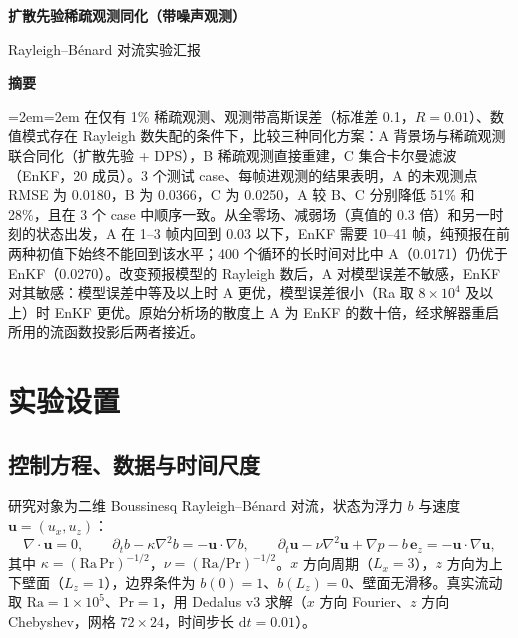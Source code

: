 \documentclass[10.5pt,a4paper]{article}
\begin{document}
\begin{center}
{\LARGE\bfseries 扩散先验稀疏观测同化（带噪声观测）\par}\vspace{.5em}
{\large Rayleigh--B\'enard 对流实验汇报\par}
\end{center}
\vspace{.3em}

\begin{center}\textbf{摘\quad 要}\end{center}
\begingroup\small\leftskip=2em\rightskip=2em
在仅有 1\% 稀疏观测、观测带高斯误差（标准差 0.1，$R=0.01$）、数值模式存在 Rayleigh 数失配的条件下，比较三种同化方案：A 背景场与稀疏观测联合同化（扩散先验 + DPS），B 稀疏观测直接重建，C 集合卡尔曼滤波（EnKF，20 成员）。3 个测试 case、每帧进观测的结果表明，A 的未观测点 RMSE 为 0.0180，B 为 0.0366，C 为 0.0250，A 较 B、C 分别降低 51\% 和 28\%，且在 3 个 case 中顺序一致。从全零场、减弱场（真值的 0.3 倍）和另一时刻的状态出发，A 在 1--3 帧内回到 0.03 以下，EnKF 需要 10--41 帧，纯预报在前两种初值下始终不能回到该水平；400 个循环的长时间对比中 A（0.0171）仍优于 EnKF（0.0270）。改变预报模型的 Rayleigh 数后，A 对模型误差不敏感，EnKF 对其敏感：模型误差中等及以上时 A 更优，模型误差很小（Ra 取 $8\times10^4$ 及以上）时 EnKF 更优。原始分析场的散度上 A 为 EnKF 的数十倍，经求解器重启所用的流函数投影后两者接近。
\par\endgroup

\section{实验设置}
\subsection{控制方程、数据与时间尺度}
研究对象为二维 Boussinesq Rayleigh--B\'enard 对流，状态为浮力 $b$ 与速度 $\mathbf u=(u_x,u_z)$：
\begin{equation}
\nabla\!\cdot\!\mathbf u=0,\qquad \partial_t b-\kappa\nabla^2 b=-\mathbf u\!\cdot\!\nabla b,\qquad \partial_t\mathbf u-\nu\nabla^2\mathbf u+\nabla p-b\,\mathbf e_z=-\mathbf u\!\cdot\!\nabla\mathbf u,
\end{equation}
其中 $\kappa=(\mathrm{Ra}\,\mathrm{Pr})^{-1/2}$，$\nu=(\mathrm{Ra}/\mathrm{Pr})^{-1/2}$。$x$ 方向周期（$L_x=3$），$z$ 方向为上下壁面（$L_z=1$），边界条件为 $b(0)=1$、$b(L_z)=0$、壁面无滑移。真实流动取 $\mathrm{Ra}=1\times10^{5}$、$\mathrm{Pr}=1$，用 Dedalus v3 求解（$x$ 方向 Fourier、$z$ 方向 Chebyshev，网格 $72\times24$，时间步长 $\mathrm{d}t=0.01$）。
\end{document}

